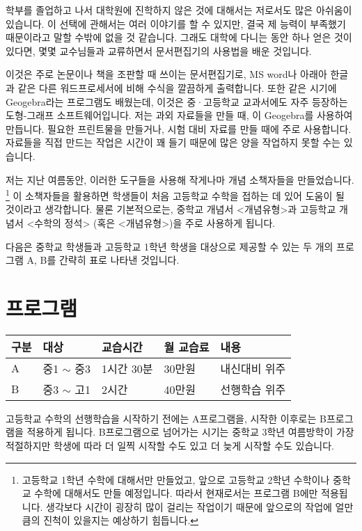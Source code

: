 \documentclass{oblivoir}
\begin{document}
학부를 졸업하고 나서 대학원에 진학하지 않은 것에 대해서는 저로서도 많은 아쉬움이 있습니다.
이 선택에 관해서는 여러 이야기를 할 수 있지만, 결국 제 능력이 부족했기 때문이라고 말할 수밖에 없을 것 같습니다.
그래도 대학에 다니는 동안 하나 얻은 것이 있다면, 몇몇 교수님들과 교류하면서  문서편집기의 사용법을 배운 것입니다.

이것은 주로 논문이나 책을 조판할 때 쓰이는 문서편집기로, MS word나 아래아 한글과 같은 다른 워드프로세서에 비해 수식을 깔끔하게 출력합니다.
또한 같은 시기에 Geogebra라는 프로그램도 배웠는데, 이것은 중·고등학교 교과서에도 자주 등장하는 도형-그래프 소프트웨어입니다.
저는 과외 자료들을 만들 때, 이   Geogebra를 사용하여 만듭니다.
필요한 프린트물을 만들거나, 시험 대비 자료를 만들 때에 주로 사용합니다.
자료들을 직접 만드는 작업은 시간이 꽤 들기 때문에 많은 양을 작업하지 못할 수는 있습니다.

저는 지난 여름동안, 이러한 도구들을 사용해 작게나마 개념 소책자들을 만들었습니다.%
\footnote{고등학교 1학년 수학에 대해서만 만들었고, 앞으로 고등학교 2학년 수학이나 중학교 수학에 대해서도 만들 예정입니다.
따라서 현재로서는 프로그램 B에만 적용됩니다.
생각보다 시간이 굉장히 많이 걸리는 작업이기 때문에 앞으로의 작업에 얼만큼의 진척이 있을지는 예상하기 힘듭니다.}
이 소책자들을 활용하면 학생들이 처음 고등학교 수학을 접하는 데 있어 도움이 될 것이라고 생각합니다.
물론 기본적으로는, 중학교 개념서 <개념유형>과 고등학교 개념서 <수학의 정석> (혹은 <개념유형>)을 주로 사용하게 됩니다.

\bigskip
다음은 중학교 학생들과 고등학교 1학년 학생을 대상으로 제공할 수 있는 두 개의 프로그램 A, B를 간략히 표로 나타낸 것입니다.

\section{프로그램}
\begin{center}
\centering\small
\begin{tabu}{|X[c]|X[c]X[1.3,c]X[c]X[2,c]|}
\hline
구분	&대상			&교습시간	&월 교습료	&내용		\\\hline
A	&중1 \(\sim\) 중3	&1시간 30분	&30만원		&내신대비 위주\\
B	&중3 \(\sim\) 고1	&2시간		&40만원		&선행학습 위주\\\hline
\end{tabu}
\end{center}

고등학교 수학의 선행학습을 시작하기 전에는 A프로그램을, 시작한 이후로는 B프로그램을 적용하게 됩니다.
B프로그램으로 넘어가는 시기는 중학교 3학년 여름방학이 가장 적절하지만  학생에 따라 더 일찍 시작할 수도 있고 더 늦게 시작할 수도 있습니다.
\end{document}
